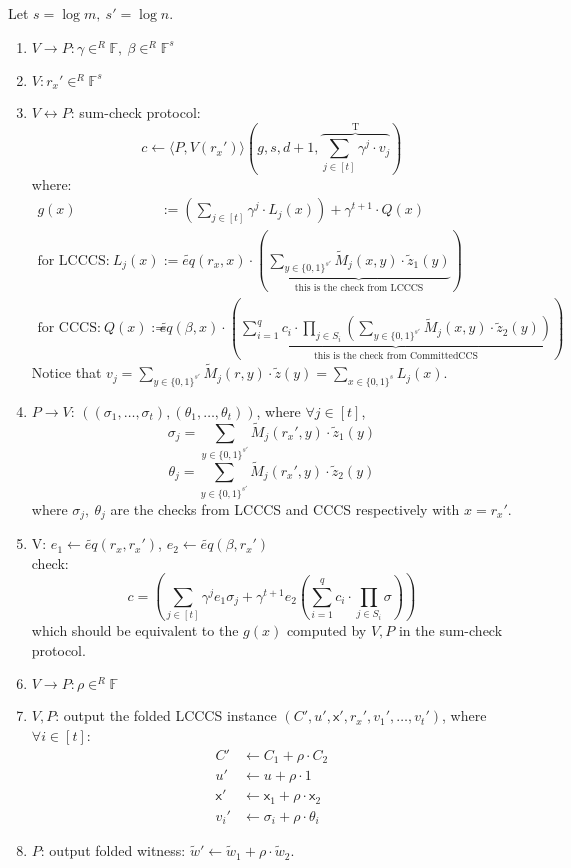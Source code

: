 \documentclass{article}
\theoremstyle{definition}
\begin{document}
\vspace{1cm}

Let $s= \log m,~ s'= \log n$.

\begin{enumerate}
	\item $V \rightarrow P: \gamma \in^R \mathbb{F},~ \beta \in^R \mathbb{F}^s$
	\item $V: r_x' \in^R \mathbb{F}^s$
	\item $V \leftrightarrow P$: sum-check protocol:
		$$c \leftarrow \langle P, V(r_x') \rangle (g, s, d+1, \overbrace{\sum_{j \in [t]} \gamma^j \cdot v_j}^\text{T})$$
		where:
		\begin{align*}
			g(x) &:= \left( \sum_{j \in [t]} \gamma^j \cdot L_j(x) \right) + \gamma^{t+1} \cdot Q(x)\\
			\text{for LCCCS:}~ L_j(x) &:= \widetilde{eq}(r_x, x) \cdot \left(
				\underbrace{\sum_{y \in \{0,1\}^{s'}} \widetilde{M}_j(x, y) \cdot \widetilde{z}_1(y)}_\text{this is the check from LCCCS}
			\right)\\
				\text{for CCCS:}~ Q(x) := &\widetilde{eq}(\beta, x) \cdot \left(
				\underbrace{ \sum_{i=1}^q c_i \cdot \prod_{j \in S_i} \left( \sum_{y \in \{0, 1\}^{s'}} \widetilde{M}_j(x, y) \cdot \widetilde{z}_2(y) \right) }_\text{this is the check from CommittedCCS}
			\right)
		\end{align*}
		Notice that $v_j= \sum_{y\in \{0,1\}^{s'}} \widetilde{M}_j(r, y) \cdot \widetilde{z}(y) = \sum_{x\in \{0,1\}^s} L_j(x)$.
	\item $P \rightarrow V$: $\left( (\sigma_1, \ldots, \sigma_t), (\theta_1, \ldots, \theta_t) \right)$, where $\forall j \in [t]$,
		$$\sigma_j = \sum_{y \in \{0,1\}^{s'}} \widetilde{M}_j(r_x', y) \cdot \widetilde{z}_1(y)$$
		$$\theta_j = \sum_{y \in \{0, 1\}^{s'}} \widetilde{M}_j(r_x', y) \cdot \widetilde{z}_2(y)$$
		where $\sigma_j,~\theta_j$ are the checks from LCCCS and CCCS respectively with $x=r_x'$.
	\item V: $e_1 \leftarrow \widetilde{eq}(r_x, r_x')$, $e_2 \leftarrow \widetilde{eq}(\beta, r_x')$\\
		check:
		$$c = \left( \sum_{j \in [t]} \gamma^j e_1 \sigma_j + \gamma^{t+1} e_2 \left( \sum_{i=1}^q c_i \cdot \prod_{j \in S_i} \sigma \right) \right)$$
		which should be equivalent to the $g(x)$ computed by $V,P$ in the sum-check protocol.
	\item $V \rightarrow P: \rho \in^R \mathbb{F}$
	\item $V, P$: output the folded LCCCS instance $(C', u', \mathsf{x}', r_x', v_1', \ldots, v_t')$, where $\forall i \in [t]$:
		\begin{align*}
			C' &\leftarrow C_1 + \rho \cdot C_2\\
			u' &\leftarrow u + \rho \cdot 1\\
			\mathsf{x}' &\leftarrow \mathsf{x}_1 + \rho \cdot \mathsf{x}_2\\
			v_i' &\leftarrow \sigma_i + \rho \cdot \theta_i
		\end{align*}
	\item $P$: output folded witness: $\widetilde{w}' \leftarrow \widetilde{w}_1 + \rho \cdot \widetilde{w}_2$.
\end{enumerate}
\end{document}
